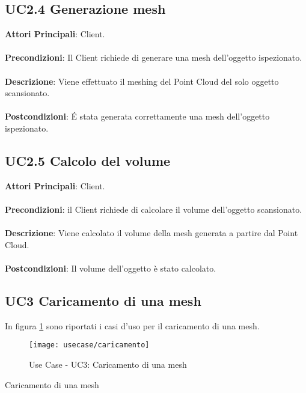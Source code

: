 \subsection{UC2.4 Generazione mesh}
\textbf{Attori Principali}: Client.
\\\\ \textbf{Precondizioni}: Il Client richiede di generare una mesh dell'oggetto ispezionato.
\\\\ \textbf{Descrizione}: Viene effettuato il meshing del Point Cloud del solo oggetto scansionato.
\\\\ \textbf{Postcondizioni}: \'E stata generata correttamente una mesh dell'oggetto ispezionato.

\subsection{UC2.5 Calcolo del volume}
\textbf{Attori Principali}: Client.
\\\\ \textbf{Precondizioni}: il Client richiede di calcolare il volume dell'oggetto scansionato.
\\\\ \textbf{Descrizione}: Viene calcolato il volume della mesh generata a partire dal Point Cloud.
\\\\ \textbf{Postcondizioni}: Il volume dell'oggetto è stato calcolato.

\newpage

\subsection{UC3 Caricamento di una mesh}
In figura \ref{fig:caricamento} sono riportati i casi d'uso per il caricamento di una mesh.
\begin{figure}[!h] 
    \centering 
    \texttt{[image: usecase/caricamento]} 
    \caption{Use Case - UC3: Caricamento di una mesh}
    \label{fig:caricamento}
\end{figure}

\begin{usecase}{3}{Caricamento di una mesh}
\\ 
\\ 
\\ 
\label{uc:caricamento}
\end{usecase}

